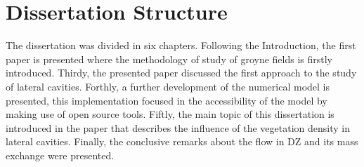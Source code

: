 \section{Dissertation Structure}
The dissertation was divided in six chapters. Following the Introduction, the first paper is presented where the methodology of study of groyne fields is firstly introduced. Thirdy, the presented paper discussed the first approach to the study of lateral cavities. Forthly, a further development of the numerical model is presented, this implementation focused in the accessibility of the model by making use of open source tools. Fiftly, the main topic of this dissertation is introduced in the paper that describes the influence of the vegetation density in lateral cavities. Finally, the conclusive remarks about the flow in DZ and its mass exchange were presented.


